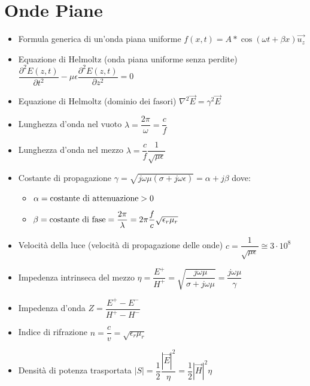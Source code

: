 \documentclass{article}
\begin{document}
\section{Onde Piane}
\begin{itemize}
	\item Formula generica di un'onda piana uniforme \( f(x, t) = A * \cos\left(\omega t + \beta x \right) \vec{u_z} \)
	\item Equazione di Helmoltz (onda piana uniforme senza perdite) \( \dfrac{\partial^2 E(z, t)}{\partial t^2} - \mu \epsilon \dfrac{\partial^2 E(z, t)}{\partial z^2} = 0\)
	\item Equazione di Helmoltz (dominio dei fasori) \( \nabla^2 \vec{E} = \gamma^2 \vec{E} \)
	\item Lunghezza d'onda nel vuoto \( \lambda = \dfrac{2 \pi}{\omega} = \dfrac{c}{f} \)	
	\item Lunghezza d'onda nel mezzo \( \lambda = \dfrac{c}{f} \dfrac{1}{\sqrt{\mu \epsilon}} \)
	\item Costante di propagazione \( \gamma = \sqrt{j\omega\mu (\sigma + j \omega \epsilon) } = \alpha + j \beta \) dove:
	\begin{itemize}
		\item \( \alpha = \textnormal{costante di attenuazione} > 0\)
		\item \( \beta = \textnormal{costante di fase} = \dfrac{2 \pi}{\lambda} = 2 \pi \dfrac{f}{c} \sqrt{\epsilon_r \mu_r}\)
	\end{itemize}
	\item Velocità della luce (velocità di propagazione delle onde) \( c = \dfrac{1}{\sqrt{\mu \epsilon}} \cong 3 \cdot 10^8 \)
	\item Impedenza intrinseca del mezzo \( \eta = \dfrac{E^+}{H^+} = \displaystyle \sqrt{\dfrac{j \omega \mu}{\sigma + j \omega \mu}} = \dfrac{j \omega \mu}{\gamma}\)
	\item Impedenza d'onda \( Z = \dfrac{E^+ - E^-}{H^+ - H^-} \)
	\item Indice di rifrazione \( n = \dfrac{c}{v} = \sqrt{\epsilon_r \mu_r} \)
	\item Densità di potenza trasportata \( |S| = \dfrac{1}{2} \dfrac{|\vec{E}|^2}{\eta} = \dfrac{1}{2} |\vec{H}|^2 \eta \)
\end{itemize}
\end{document}
